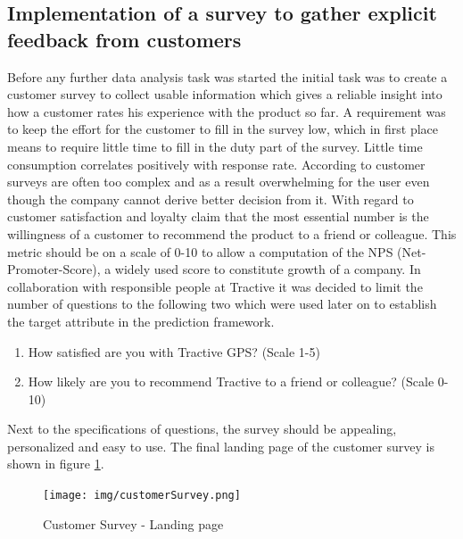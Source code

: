 \subsection{Implementation of a survey to gather explicit feedback from customers}
Before any further data analysis task was started the initial task was to create a customer survey to collect usable information which gives a reliable insight into how a customer rates his experience with the product so far. A requirement was to keep the effort for the customer to fill in the survey low, which in first place means to require little time to fill in the duty part of the survey. Little time consumption correlates positively with response rate. According to \cite{reichheld2003one} customer surveys are often too complex and as a result overwhelming for the user even though the company cannot derive better decision from it. With regard to customer satisfaction and loyalty \cite{reichheld2003one} claim that the most essential number is the willingness of a customer to recommend the product to a friend or colleague. This metric should be on a scale of 0-10 to allow a computation of the NPS (Net-Promoter-Score), a widely used score to constitute growth of a company. In collaboration with responsible people at Tractive it was decided to limit the number of questions to the following two which were used later on to establish the target attribute in the prediction framework.

\begin{enumerate}
	\item How satisfied are you with Tractive GPS? (Scale 1-5)
	\item How likely are you to recommend Tractive to a friend or colleague? (Scale 0-10)
\end{enumerate}

Next to the specifications of questions, the survey should be appealing, personalized and easy to use. The final landing page of the customer survey is shown in figure \ref{fig:customerSurvey}. 

\begin{figure}
	\centering
	\texttt{[image: img/customerSurvey.png]}
	\caption{Customer Survey - Landing page}
	\label{fig:customerSurvey}
\end{figure} 

